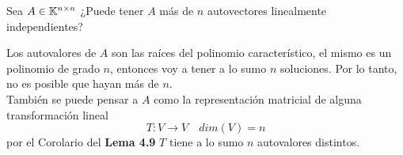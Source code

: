 \item Sea $A\in\mathbb{K}^{n\times n}$ ¿Puede tener $A$ más de $n$ autovectores linealmente independientes?
    \begin{mdframed}[style=s]
        Los autovalores de $A$ son las raíces del polinomio característico, el mismo es un polinomio de grado $n$, entonces voy a tener a lo sumo $n$ soluciones. Por lo tanto, no es posible que hayan más de $n$.\\
        También se puede pensar a $A$ como la representación matricial de alguna transformación lineal 
        \[T:V\to V\quad dim(V)=n\]
        por el Corolario del \textbf{Lema 4.9} $T$ tiene a lo sumo $n$ autovalores distintos.
    \end{mdframed}